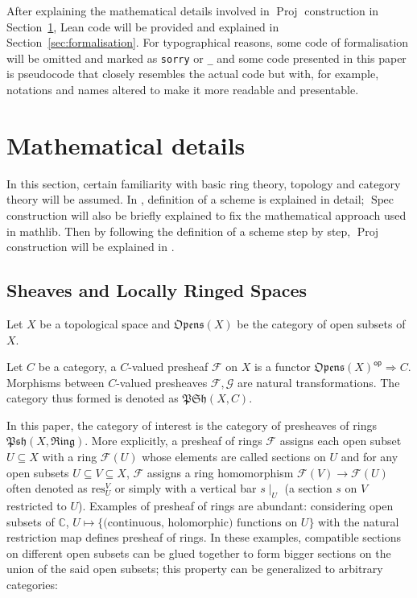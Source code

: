 \documentclass[a4paper,UKenglish,cleveref, autoref, thm-restate]{lipics-v2021}
\begin{document}
After explaining the mathematical details involved in $\operatorname{Proj}$ construction in Section~\ref{sec:maths}, Lean code will be provided and explained in Section~\ref{sec:formalisation}. For typographical reasons, some code of formalisation will be omitted and marked as \lstinline{sorry} or \lstinline{_} and some code presented in this paper is pseudocode that closely resembles the actual code but with, for example, notations and names altered to make it more readable and presentable.

\section{Mathematical details}\label{sec:maths}
In this section, certain familiarity with basic ring theory, topology and category theory will be assumed. In , definition of a scheme is explained in detail; $\operatorname{Spec}$ construction will also be briefly explained to fix the mathematical approach used in \textsf{mathlib}. Then by following the definition of a scheme step by step, $\operatorname{Proj}$ construction will be explained in .

\subsection{Sheaves and Locally Ringed Spaces}\label{sec:pre-def}
Let $X$ be a topological space and $\mathfrak{Opens}(X)$ be the category of open subsets of $X$.

\begin{definition} 
    Let $C$ be a category, a $C$-valued presheaf $\mathcal{F}$ on $X$ is a functor $\mathfrak{Opens}(X)^{\mathsf{op}} \Longrightarrow C$. Morphisms between $C$-valued presheaves $\mathcal{F, G}$ are natural transformations. The category thus formed is denoted as $\mathfrak{PSh}(X, C)$.
    \label{def:presheaf}
\end{definition}
In this paper, the category of interest is the category of presheaves of rings $\mathfrak{Psh}(X, \mathfrak{Ring})$. More explicitly, a presheaf of rings $\mathcal{F}$ assigns each open subset $U \subseteq X$ with a ring $\mathcal{F}(U)$ whose elements are called sections on $U$ and for any open subsets $U \subseteq V\subseteq X$, $\mathcal F$ assigns a ring homomorphism $\mathcal{F}(V)\to\mathcal{F}(U)$ often denoted as $\mathrm{res}^V_U$ or simply with a vertical bar $s\!\mid_U$ (a section $s$ on $V$ restricted to $U$). Examples of presheaf of rings are abundant: considering open subsets of $\mathbb{C}$, $U \mapsto \{\text{(continuous, holomorphic) functions on~} U\}$ with the natural restriction map defines presheaf of rings. In these examples, compatible sections on different open subsets can be glued together to form bigger sections on the union of the said open subsets; this property can be generalized to arbitrary categories:
\end{document}
